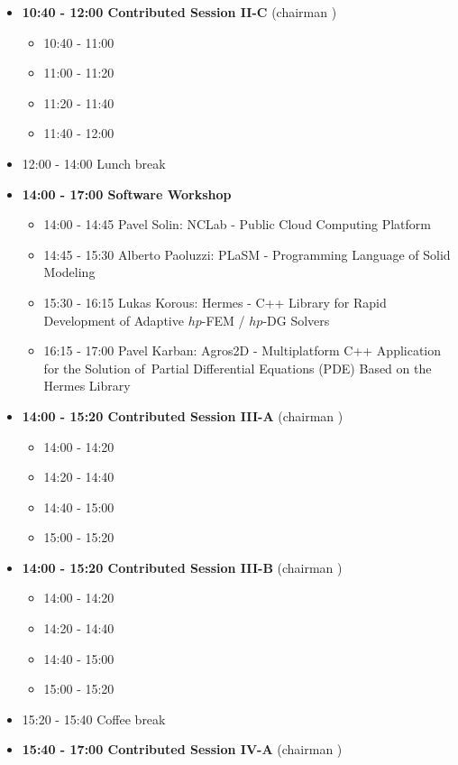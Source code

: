\documentclass[10pt, A4]{article}%
\begin{document}
\begin{itemize}
\begin{itemize}
  \end{itemize}
  \item {\bf 10:40 - 12:00 Contributed Session II-C} (chairman ) 
  \begin{itemize}
    \item 10:40 - 11:00
    \item 11:00 - 11:20 
    \item 11:20 - 11:40 
    \item 11:40 - 12:00 
  \end{itemize}
  \item 12:00 - 14:00 Lunch break
  \item {\bf 14:00 - 17:00 Software Workshop}
  \begin{itemize}
    \item 14:00 - 14:45 Pavel Solin: NCLab - Public Cloud Computing Platform
    \item 14:45 - 15:30 Alberto Paoluzzi: PLaSM - Programming Language of Solid Modeling
    \item 15:30 - 16:15 Lukas Korous: Hermes - C++ Library for Rapid Development of Adaptive $hp$-FEM / $hp$-DG Solvers
    \item 16:15 - 17:00 Pavel Karban: Agros2D - Multiplatform C++ Application for the Solution of~Partial Differential Equations (PDE) Based on the Hermes Library  
  \end{itemize}
  \item {\bf 14:00 - 15:20 Contributed Session III-A} (chairman ) 
  \begin{itemize}
    \item 14:00 - 14:20 
    \item 14:20 - 14:40 
    \item 14:40 - 15:00
    \item 15:00 - 15:20  
  \end{itemize}
  \item {\bf 14:00 - 15:20 Contributed Session III-B} (chairman ) 
  \begin{itemize}
    \item 14:00 - 14:20 
    \item 14:20 - 14:40 
    \item 14:40 - 15:00
    \item 15:00 - 15:20  
  \end{itemize}
  \item 15:20 - 15:40 Coffee break
  \item {\bf 15:40 - 17:00 Contributed Session IV-A} (chairman ) 
  \begin{itemize}

\end{itemize}
\end{itemize}
\end{document}
